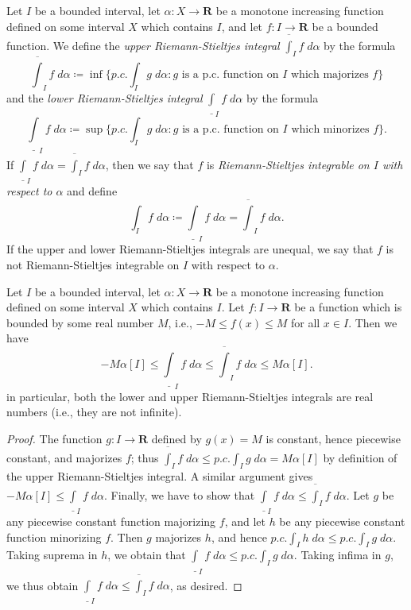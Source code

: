 \begin{additional corollary}\label{ac 11.8.7}
Let \(I\) be a bounded interval, let \(\alpha : X \to \mathbf{R}\) be a monotone increasing function defined on some interval \(X\) which contains \(I\), and let \(f : I \to \mathbf{R}\) be a bounded function.
We define the \emph{upper Riemann-Stieltjes integral} \(\overline{\int}_I f \; d \alpha\) by the formula
\[
    \overline{\int}_I f \; d \alpha \coloneqq \inf\bigg\{p.c. \int_I g \; d \alpha : g \text{ is a p.c. function on \(I\) which majorizes } f\bigg\}
\]
and the \emph{lower Riemann-Stieltjes integral} \(\underline{\int}_I f \; d \alpha\) by the formula
\[
    \underline{\int}_I f \; d \alpha \coloneqq \sup\bigg\{p.c. \int_I g \; d \alpha : g \text{ is a p.c. function on \(I\) which minorizes } f\bigg\}.
\]
If \(\underline{\int}_I f \; d \alpha = \overline{\int}_I f \; d \alpha\), then we say that \(f\) is \emph{Riemann-Stieltjes integrable on \(I\) with respect to \(\alpha\)} and define
\[
    \int_I f \; d \alpha \coloneqq \underline{\int}_I f \; d \alpha = \overline{\int}_I f \; d \alpha.
\]
If the upper and lower Riemann-Stieltjes integrals are unequal, we say that \(f\) is not Riemann-Stieltjes integrable on \(I\) with respect to \(\alpha\).
\end{additional corollary}

\begin{additional corollary}\label{ac 11.8.8}
Let \(I\) be a bounded interval, let \(\alpha : X \to \mathbf{R}\) be a monotone increasing function defined on some interval \(X\) which contains \(I\).
Let \(f : I \to \mathbf{R}\) be a function which is bounded by some real number \(M\), i.e., \(-M \leq f(x) \leq M\) for all \(x \in I\).
Then we have
\[
    -M \alpha[I] \leq \underline{\int}_I f \; d \alpha \leq \overline{\int}_I f \; d \alpha \leq M \alpha[I].
\]
in particular, both the lower and upper Riemann-Stieltjes integrals are real numbers (i.e., they are not infinite).
\end{additional corollary}

\begin{proof}
    The function \(g : I \to \mathbf{R}\) defined by \(g(x) = M\) is constant, hence piecewise constant, and majorizes \(f\);
    thus \(\overline{\int}_I f \; d \alpha \leq p.c. \int_I g \; d \alpha = M \alpha[I]\) by definition of the upper Riemann-Stieltjes integral.
    A similar argument gives \(-M \alpha[I] \leq \underline{\int}_I f \; d \alpha\).
    Finally, we have to show that \(\underline{\int}_I f \; d \alpha \leq \overline{\int}_I f \; d \alpha\).
    Let \(g\) be any piecewise constant function majorizing \(f\), and let \(h\) be any piecewise constant function minorizing \(f\).
    Then \(g\) majorizes \(h\), and hence \(p.c. \int_I h \; d \alpha \leq p.c. \int_I g \; d \alpha\).
    Taking suprema in \(h\), we obtain that \(\underline{\int}_I f \; d \alpha \leq p.c. \int_I g \; d \alpha\).
    Taking infima in \(g\), we thus obtain \(\underline{\int}_I f \; d \alpha \leq \overline{\int}_I f \; d \alpha\), as desired.
\end{proof}

